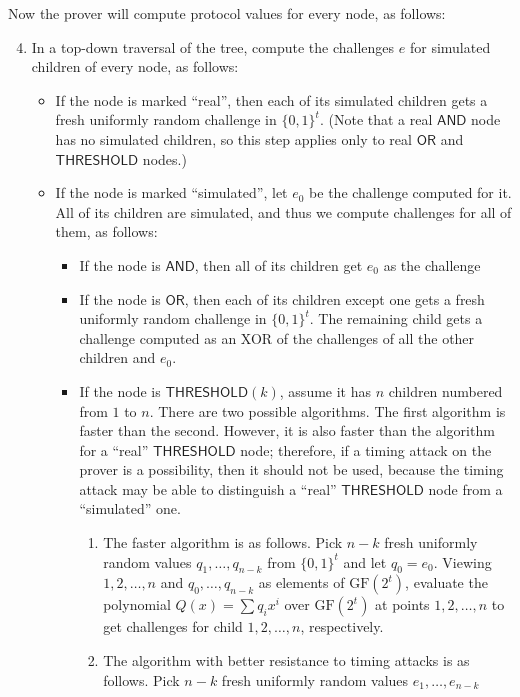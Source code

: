 \documentclass[11pt]{article}
\newcommand{\andnode}{\ensuremath{\mathsf{AND}}}
\newcommand{\ornode}{\ensuremath{\mathsf{OR}}}
\newcommand{\tnode}{\ensuremath{\mathsf{THRESHOLD}}}
\newcommand{\GF}{\ensuremath{\mathrm{GF}}}
\begin{document}
\noindent
Now the prover will compute protocol values for every node, as follows:

\begin{enumerate}
\setcounter{enumi}{3}
    \item In a top-down traversal of the tree, compute the challenges $e$ for simulated children of every node, as follows:
    \begin{itemize}
        \item If the node is marked ``real'', then each of its simulated children gets  a fresh uniformly random challenge in $\{0,1\}^t$. (Note that a real $\andnode$ node has no simulated children, so this step applies only to real $\ornode$ and $\tnode$ nodes.)
        \item If the node is marked ``simulated'', let $e_0$ be the challenge computed for it.  All of its children are simulated, and thus we compute challenges for all of them, as follows:
        \begin{itemize}
            \item If the node is $\andnode$,  then all of its children get $e_0$ as the challenge
            \item If the node is $\ornode$, then each of its children except one gets a fresh uniformly random challenge in $\{0,1\}^t$. The remaining child gets a challenge computed as an XOR of the challenges of all the other children and $e_0$.
            \item If the node is $\tnode(k)$, assume it has $n$ children numbered from $1$ to $n$. There are two possible algorithms. The first algorithm is faster than the second. However, it is also faster than the algorithm for a ``real'' $\tnode$ node; therefore, if a timing attack on the prover is a possibility, then it should not be used, because the timing attack may be able to distinguish a ``real'' $\tnode$ node from a ``simulated'' one.
            \begin{enumerate} 
            	\item The faster algorithm is as follows. Pick  $n-k$ fresh uniformly random values $q_1, \dots, q_{n-k}$ from $\{0,1\}^t$ and let
	         $q_0=e_0$. Viewing $1, 2, \dots, n$ and $q_0, \dots, q_{n-k}$ as elements of $\GF(2^t)$, 
	         evaluate the polynomial $Q(x) = \sum {q_i x^i}$ over $\GF(2^t)$ at points $1, 2, \dots, n$
	         to get challenges for child $1, 2, \dots, n$, respectively.
	         \item The algorithm with better resistance to timing attacks is as follows. Pick $n-k$ fresh uniformly random values $e_1, \dots, e_{n-k}$

\end{enumerate}
\end{itemize}
\end{itemize}
\end{enumerate}
\end{document}
